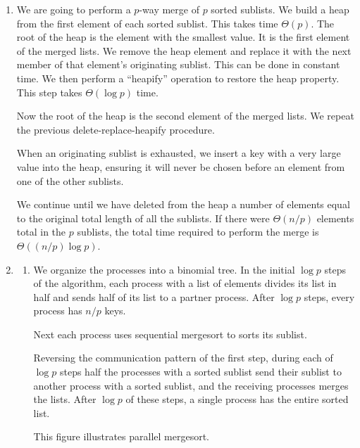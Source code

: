 \begin{enumerate}
\item
We are going to perform a $p$-way merge of $p$ sorted sublists.
We build a heap from the first element of each sorted sublist.
This takes time $\Theta(p)$.
The root of the heap is the element with the smallest value.
It is the first element of the merged lists.
We remove the heap element and replace it with the next member of
that element's originating sublist.
This can be done in constant time.
We then perform a ``heapify'' operation to restore the heap property.
This step takes $\Theta(\log p)$ time.

Now the root of the heap is the second element of the merged lists.
We repeat the previous delete-replace-heapify procedure.

When an originating sublist is exhausted, we insert a key with
a very large value into the heap, ensuring it will never be chosen 
before an element from one of the other sublists.

We continue until we have deleted from the heap a number of elements
equal to the original total length of all the sublists.
If there were $\Theta(n/p)$ elements total in the $p$ sublists,
the total time required to perform the merge is $\Theta((n/p)\log p)$.

\addtocounter{enumi}{2}

\item
\begin{enumerate}
\item We organize the processes into a binomial tree.
      In the initial $\log p$ steps of the algorithm, each process with
      a list of elements divides its list in half and sends half of its
      list to a partner process.
      After $\log p$ steps, every process has $n/p$ keys.

      Next each process uses sequential mergesort to sorts its sublist.

      Reversing the communication pattern of the first step, during each
      of $\log p$ steps half the processes with a sorted sublist send their
      sublist to another process with a sorted sublist, and the receiving
      processes merges the lists. After $\log p$ of these steps, a single
      process has the entire sorted list.

      This figure illustrates parallel mergesort.

      \begin{center}
      \end{center}


\end{enumerate}
\end{enumerate}
